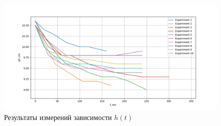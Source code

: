 \documentclass[a4paper,12pt]{report}
\begin{document}
    \begin{figure}[H]
        \centering
        \includegraphics*[width=1\linewidth]{h(t).png}
        \caption{Результаты измерений зависимости $h(t)$}
    \end{figure} 
    \newpage   
\end{document}
